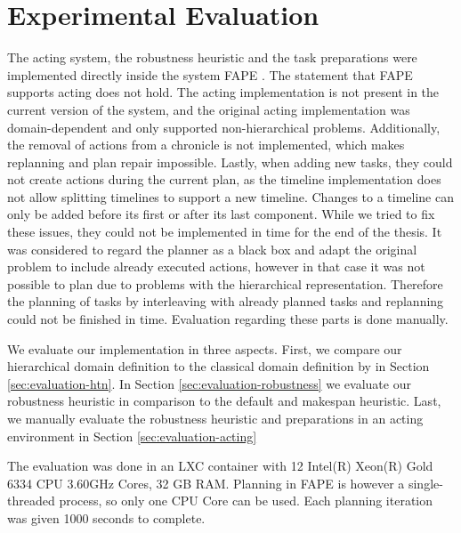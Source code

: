 \section{Experimental Evaluation}\label{sec:evaluation}

The acting system, the robustness heuristic and the task preparations were implemented directly inside the system FAPE \citep{bit-monnotTemporalHierarchicalModels2016a}.
The statement that FAPE supports acting \citep{dvorakPlanningActingTemporal2014,bit-monnotTemporalHierarchicalModels2016a,bit-monnotFAPEConstraintbasedPlanner2020} does not hold.
The acting implementation is not present in the current version of the system, and the original acting implementation was domain-dependent and only supported non-hierarchical problems.
Additionally, the removal of actions from a chronicle is not implemented, which makes replanning and plan repair impossible.
Lastly, when adding new tasks, they could not create actions during the current plan, as the timeline implementation does not allow splitting timelines to support a new timeline.
Changes to a timeline can only be added before its first or after its last component.
While we tried to fix these issues, they could not be implemented in time for the end of the thesis.
It was considered to regard the planner as a black box and adapt the original problem to include already executed actions, however in that case it was not possible to plan due to problems with the hierarchical representation.
Therefore the planning of tasks by interleaving with already planned tasks and replanning could not be finished in time.
Evaluation regarding these parts is done manually.

We evaluate our implementation in three aspects.
First, we compare our hierarchical domain definition to the classical domain definition by \cite{yuxinliuPlanningOvercookedGame2020} in Section \ref{sec:evaluation-htn}.
In Section \ref{sec:evaluation-robustness} we evaluate our robustness heuristic in comparison to the default and makespan heuristic.
Last, we manually evaluate the robustness heuristic and preparations in an acting environment in Section \ref{sec:evaluation-acting}

The evaluation was done in an LXC container with 12 Intel(R) Xeon(R) Gold 6334 CPU 3.60GHz Cores, 32 GB RAM.
Planning in FAPE is however a single-threaded process, so only one CPU Core can be used.
Each planning iteration was given 1000 seconds to complete.

